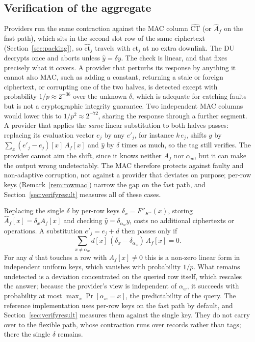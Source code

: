 \documentclass[a4paper,fleqn]{cas-sc}
\begin{document}
\subsection{Verification of the aggregate}
\label{sec:verify}
Providers run the same contraction against the MAC column
$\widehat{\text{CT}}$ (or $\widehat{A}_f$ on the fast path), which sits in the
second slot row of the same ciphertext (Section~\ref{sec:packing}), so
$\widehat{\text{ct}}_j$ travels with $\text{ct}_j$ at no extra downlink. The DU
decrypts once and aborts unless $\hat{y}=\delta y$. The check is linear, and that fixes
precisely what it covers. A provider that perturbs its response by anything it
cannot also MAC, such as adding a constant, returning a stale or foreign
ciphertext, or corrupting one of the two halves, is detected except with
probability $1/p\approx2^{-36}$ over the unknown $\delta$, which is adequate
for catching faults but is not a cryptographic integrity guarantee. Two
independent MAC columns would lower this to $1/p^2\approx2^{-72}$, sharing
the response through a further segment. A provider that applies the \emph{same}
linear substitution to both halves passes: replacing its evaluation vector
$e_j$ by any $e'_j$, for instance $k\,e_j$, shifts $y$ by
$\sum_x(e'_j-e_j)[x]\,A_f[x]$ and $\hat y$ by $\delta$ times as much, so the
tag still verifies. The provider cannot aim the shift, since it knows neither
$A_f$ nor $\alpha_w$, but it can make the output wrong undetectably. The MAC
therefore protects against faulty and non-adaptive corruption, not against a
provider that deviates on purpose; per-row keys (Remark~\ref{rem:rowmac})
narrow the gap on the fast path, and Section~\ref{sec:verifyresult} measures
all of these cases.

\begin{remark}
\label{rem:rowmac}
Replacing the single $\delta$ by per-row keys $\delta_x=F''_{K''}(x)$, storing
$\widehat{A}_f[x]=\delta_x A_f[x]$ and checking $\hat y=\delta_{\alpha_w}y$,
costs no additional ciphertexts or operations. A substitution $e'_j=e_j+d$
then passes only if
\[
\textstyle\sum_{x\neq\alpha_w}d[x]\,(\delta_x-\delta_{\alpha_w})\,A_f[x]=0 .
\]
For any $d$ that touches a row with $A_f[x]\neq 0$ this is a
non-zero linear form in independent uniform keys, which vanishes with
probability $1/p$. What remains undetected is a deviation concentrated on the
queried row itself, which rescales the answer; because the provider's view is
independent of $\alpha_w$, it succeeds with probability at most
$\max_x\Pr[\alpha_w=x]$, the predictability of the query. The reference
implementation uses per-row keys on the fast path by default, and
Section~\ref{sec:verifyresult} measures them against the single key. They do
not carry over to the flexible path, whose contraction runs over records rather
than tags; there the single $\delta$ remains.
\end{remark}
\end{document}
